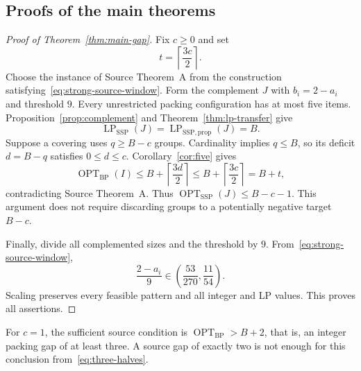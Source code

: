 \documentclass[11pt,a4paper]{article}
\theoremstyle{definition}
\theoremstyle{remark}
\newcommand{\BP}{\mathrm{BP}}
\newcommand{\SSP}{\mathrm{SSP}}
\newcommand{\OPT}{\operatorname{OPT}}
\newcommand{\LP}{\operatorname{LP}}
\newcommand{\ceil}[1]{\left\lceil #1\right\rceil}
\begin{document}
\subsection{Proofs of the main theorems}
\begin{proof}[Proof of Theorem~\ref{thm:main-gap}]
Fix $c\ge0$ and set
\begin{equation}\label{eq:source-allowance}
 t=\ceil{\frac{3c}{2}}.
\end{equation}
Choose the instance of Source Theorem~A from the construction satisfying~\eqref{eq:strong-source-window}. Form the complement $J$ with $b_i=2-a_i$ and threshold $9$. Every unrestricted packing configuration has at most five items. Proposition~\ref{prop:complement} and Theorem~\ref{thm:lp-transfer} give
\[
 \LP_{\SSP}(J)=\LP_{\SSP,\mathrm{prop}}(J)=B.
\]
Suppose a covering uses $q\ge B-c$ groups. Cardinality implies $q\le B$, so its deficit $d=B-q$ satisfies $0\le d\le c$. Corollary~\ref{cor:five} gives
\[
 \OPT_{\BP}(I)\le B+\ceil{\frac{3d}{2}}
 \le B+\ceil{\frac{3c}{2}}=B+t,
\]
contradicting Source Theorem~A. Thus $\OPT_{\SSP}(J)\le B-c-1$. This argument does not require discarding groups to a potentially negative target $B-c$.

Finally, divide all complemented sizes and the threshold by $9$. From~\eqref{eq:strong-source-window},
\[
 \frac{2-a_i}{9}\in\left(\frac{53}{270},\frac{11}{54}\right).
\]
Scaling preserves every feasible pattern and all integer and LP values. This proves all assertions.
\end{proof}
For $c=1$, the sufficient source condition is $\OPT_{\BP}>B+2$, that is, an integer packing gap of at least three. A source gap of exactly two is not enough for this conclusion from~\eqref{eq:three-halves}.
\end{document}
